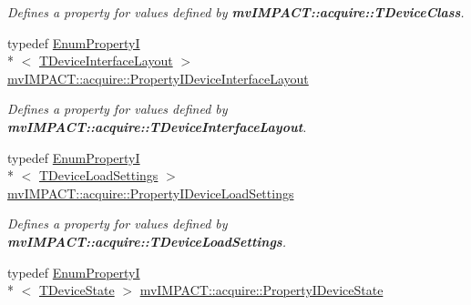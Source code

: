 \begin{DoxyCompactItemize}
\begin{DoxyCompactList}\small\item\em Defines a property for values defined by {\bfseries mv\+I\+M\+P\+A\+C\+T\+::acquire\+::\+T\+Device\+Class}. \end{DoxyCompactList}\item 
\hypertarget{group___common_interface_gab90d40765ad00c8bd36b05645f3472dc}{typedef \hyperlink{classmv_i_m_p_a_c_t_1_1acquire_1_1_enum_property_i}{Enum\+Property\+I}\\*
$<$ \hyperlink{group___common_interface_ga8206c9f9a594b7c21b43aaa624a86220}{T\+Device\+Interface\+Layout} $>$ \hyperlink{group___common_interface_gab90d40765ad00c8bd36b05645f3472dc}{mv\+I\+M\+P\+A\+C\+T\+::acquire\+::\+Property\+I\+Device\+Interface\+Layout}}\label{group___common_interface_gab90d40765ad00c8bd36b05645f3472dc}

\begin{DoxyCompactList}\small\item\em Defines a property for values defined by {\bfseries mv\+I\+M\+P\+A\+C\+T\+::acquire\+::\+T\+Device\+Interface\+Layout}. \end{DoxyCompactList}\item 
\hypertarget{group___common_interface_ga8af4dfc27c6b4403fb87ad509f67181b}{typedef \hyperlink{classmv_i_m_p_a_c_t_1_1acquire_1_1_enum_property_i}{Enum\+Property\+I}\\*
$<$ \hyperlink{group___common_interface_gae5dacc6187e94639fe9153711917d6e3}{T\+Device\+Load\+Settings} $>$ \hyperlink{group___common_interface_ga8af4dfc27c6b4403fb87ad509f67181b}{mv\+I\+M\+P\+A\+C\+T\+::acquire\+::\+Property\+I\+Device\+Load\+Settings}}\label{group___common_interface_ga8af4dfc27c6b4403fb87ad509f67181b}

\begin{DoxyCompactList}\small\item\em Defines a property for values defined by {\bfseries mv\+I\+M\+P\+A\+C\+T\+::acquire\+::\+T\+Device\+Load\+Settings}. \end{DoxyCompactList}\item 
\hypertarget{group___common_interface_ga1127fb45b2263d328e769e81b1096baf}{typedef \hyperlink{classmv_i_m_p_a_c_t_1_1acquire_1_1_enum_property_i}{Enum\+Property\+I}\\*
$<$ \hyperlink{group___common_interface_ga1207fea3233acb11831696cd74e142e8}{T\+Device\+State} $>$ \hyperlink{group___common_interface_ga1127fb45b2263d328e769e81b1096baf}{mv\+I\+M\+P\+A\+C\+T\+::acquire\+::\+Property\+I\+Device\+State}}\label{group___common_interface_ga1127fb45b2263d328e769e81b1096baf}


\end{DoxyCompactItemize}

